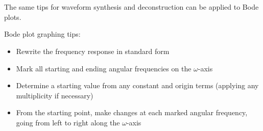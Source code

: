 \documentclass{report}
\begin{document}
\\ \\
The same tips for waveform synthesis and deconstruction can be applied to Bode plots. 
\begin{tcolorbox}[width=\textwidth,colback={white}, sharp corners]
    Bode plot graphing tips:
    \begin{itemize}
        \item Rewrite the frequency response in standard form
        \item Mark all starting and ending angular frequencies on the $\omega$-axis
        \item Determine a starting value from any constant and origin terms (applying any multiplicity if necessary)
        \item From the starting point, make changes at each marked angular frequency, going from left to right along the $\omega$-axis
    \end{itemize}
\end{tcolorbox}
\end{document}

